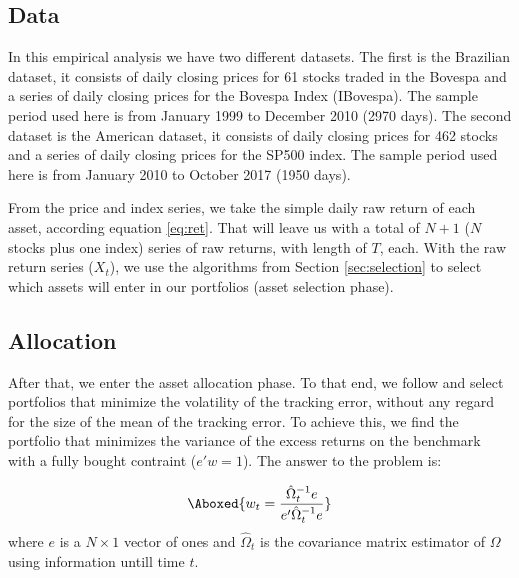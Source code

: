 \documentclass[preprint,authoryear,review,12pt]{elsarticle}
\begin{document}
\subsection{Data} \label{sec:data}

In this empirical analysis we have two different datasets.
The first is the Brazilian dataset, it consists of daily closing prices for 61 stocks traded in the Bovespa and a series of daily closing prices for the Bovespa Index (IBovespa).
The sample period used here is from January 1999 to December 2010 (2970 days).
The second dataset is the American dataset, it consists of daily closing prices for 462 stocks and a series of daily closing prices for the SP500 index.
The sample period used here is from January 2010 to October 2017 (1950 days).

From the price and index series, we take the simple daily raw return of each asset, according equation \eqref{eq:ret}.
That will leave us with a total of $N+1$ ($N$ stocks plus one index) series of raw returns, with length of $T$, each.
With the raw return series ($X_{t}$), we use the algorithms from Section \ref{sec:selection} to select which assets will enter in our portfolios (asset selection phase).

\subsection*{Allocation}
After that, we enter the asset allocation phase.
To that end, we follow \cite{liu-2009} and select portfolios that minimize the volatility of the tracking error, without any regard for the size of the mean of the tracking error.
To achieve this, we find the portfolio that minimizes the variance of the excess returns on the benchmark with a fully bought contraint ($e'w=1$).
The answer to the problem is:

\begin{align} \label{eq:gmv}
\Aboxed{%
w_{t} = \frac{\hat{\Omega}_{t}^{-1}e}{e'\hat{\Omega}_{t}^{-1}e} }
\end{align}
where $e$ is a $N \times 1$ vector of ones and $\hat{\Omega}_{t}$ is the covariance matrix estimator of $\Omega$ using information untill time $t$.
\end{document}
